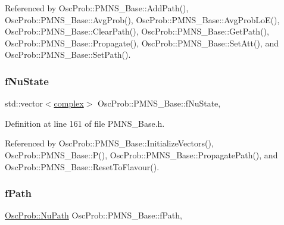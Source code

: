 Referenced by Osc\+Prob\+::\+P\+M\+N\+S\+\_\+\+Base\+::\+Add\+Path(), Osc\+Prob\+::\+P\+M\+N\+S\+\_\+\+Base\+::\+Avg\+Prob(), Osc\+Prob\+::\+P\+M\+N\+S\+\_\+\+Base\+::\+Avg\+Prob\+Lo\+E(), Osc\+Prob\+::\+P\+M\+N\+S\+\_\+\+Base\+::\+Clear\+Path(), Osc\+Prob\+::\+P\+M\+N\+S\+\_\+\+Base\+::\+Get\+Path(), Osc\+Prob\+::\+P\+M\+N\+S\+\_\+\+Base\+::\+Propagate(), Osc\+Prob\+::\+P\+M\+N\+S\+\_\+\+Base\+::\+Set\+Att(), and Osc\+Prob\+::\+P\+M\+N\+S\+\_\+\+Base\+::\+Set\+Path().

\mbox{\label{classOscProb_1_1PMNS__Base_ad38a7107c3ab393591fd5ba21658300b}} 
\subsubsection{\texorpdfstring{f\+Nu\+State}{fNuState}}
{\footnotesize\ttfamily std\+::vector$<$\hyperlink{classOscProb_1_1PMNS__Base_ae86ec4718808ce9d02e5f5b4226714ab}{complex}$>$ Osc\+Prob\+::\+P\+M\+N\+S\+\_\+\+Base\+::f\+Nu\+State\hspace{0.3cm}{\ttfamily [protected]}, {\ttfamily [inherited]}}



Definition at line 161 of file P\+M\+N\+S\+\_\+\+Base.\+h.



Referenced by Osc\+Prob\+::\+P\+M\+N\+S\+\_\+\+Base\+::\+Initialize\+Vectors(), Osc\+Prob\+::\+P\+M\+N\+S\+\_\+\+Base\+::\+P(), Osc\+Prob\+::\+P\+M\+N\+S\+\_\+\+Base\+::\+Propagate\+Path(), and Osc\+Prob\+::\+P\+M\+N\+S\+\_\+\+Base\+::\+Reset\+To\+Flavour().

\mbox{\label{classOscProb_1_1PMNS__Base_a849437aa8891fe042e86886ce8f81c6e}} 
\subsubsection{\texorpdfstring{f\+Path}{fPath}}
{\footnotesize\ttfamily \hyperlink{structOscProb_1_1NuPath}{Osc\+Prob\+::\+Nu\+Path} Osc\+Prob\+::\+P\+M\+N\+S\+\_\+\+Base\+::f\+Path\hspace{0.3cm}{\ttfamily [protected]}, {\ttfamily [inherited]}}



